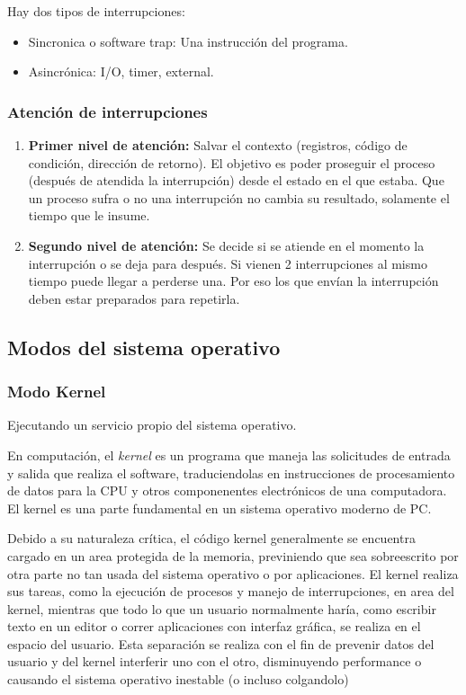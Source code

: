 \documentclass[a4paper, twoside]{article}
\begin{document}
Hay dos tipos de interrupciones:
\begin{itemize}
	\item Sincronica o software trap: Una instrucción del programa.
	\item Asincrónica: I/O, timer, external.
\end{itemize}

\subsubsection{Atención de interrupciones}
\begin{enumerate}
	\item \textbf{Primer nivel de atención:} Salvar el contexto (registros, código de condición, dirección de retorno). El objetivo es poder proseguir el proceso (después de atendida la interrupción) desde el estado en el que estaba. Que un proceso sufra o no una interrupción no cambia su resultado, solamente el tiempo que le insume.
	
	\item \textbf{Segundo nivel de atención:} Se decide si se atiende en el momento la interrupción o se deja para después. Si vienen 2 interrupciones al mismo tiempo puede llegar a perderse una. Por eso los que envían la interrupción deben estar preparados para repetirla.
\end{enumerate}

\subsection{Modos del sistema operativo}
\subsubsection{Modo Kernel}
Ejecutando un servicio propio del sistema operativo.

En computación, el \emph{kernel} es un programa que maneja las solicitudes de entrada y salida que realiza el software, traduciendolas en instrucciones de procesamiento de datos para la CPU y otros componenentes electrónicos de una computadora. El kernel es una parte fundamental en un sistema operativo moderno de PC.

Debido a su naturaleza crítica, el código kernel generalmente se encuentra cargado en un area protegida de la memoria, previniendo que sea sobreescrito por otra parte no tan usada del sistema operativo o por aplicaciones. El kernel realiza sus tareas, como la ejecución de procesos y manejo de interrupciones, en area del kernel, mientras que todo lo que un usuario normalmente haría, como escribir texto en un editor o correr aplicaciones con interfaz gráfica, se realiza en el espacio del usuario. Esta separación se realiza con el fin de prevenir datos del usuario y del kernel interferir uno con el otro, disminuyendo performance o causando el sistema operativo inestable (o incluso colgandolo)
\end{document}
